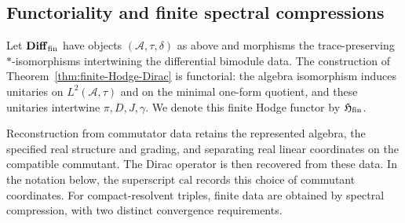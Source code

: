 \documentclass[11pt]{article}
\theoremstyle{definition}
\theoremstyle{remark}
\theoremstyle{definition}
\theoremstyle{remark}
\newcommand{\A}{\mathcal A}
\begin{document}
\subsection{Functoriality and finite spectral compressions}

Let $\mathbf{Diff}_{\rm fin}$ have objects $(\A,\tau,\delta)$ as above and
morphisms the trace-preserving $*$-isomorphisms intertwining the differential
bimodule data.  The construction of Theorem~\ref{thm:finite-Hodge-Dirac} is
functorial: the algebra isomorphism induces unitaries on $L^2(\A,\tau)$ and on the
minimal one-form quotient, and these unitaries intertwine $\pi,D,J,\gamma$.
We denote this finite Hodge functor by $\mathfrak H_{\rm fin}$.

Reconstruction from commutator data retains the represented algebra, the
specified real structure and grading, and separating real linear coordinates
on the compatible commutant.  The Dirac operator is then recovered from these
data.  In the notation below, the superscript $\mathrm{cal}$ records this
choice of commutant coordinates.  For compact-resolvent triples, finite data
are obtained by spectral compression, with two distinct convergence
requirements.
\end{document}
